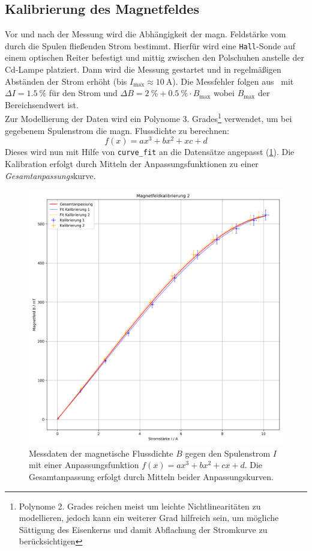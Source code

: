 \subsection{Kalibrierung des Magnetfeldes}
Vor und nach der Messung wird die Abhängigkeit der magn. Feldstärke vom durch die Spulen fließenden Strom bestimmt. Hierfür wird eine \texttt{Hall}-Sonde auf einem optischen Reiter befestigt und mittig zwischen den Polschuhen anstelle der Cd-Lampe platziert. Dann wird die Messung gestartet und in regelmäßigen Abständen der Strom erhöht (bis $I_{\text{max}}\approx \SI{10}{\ampere}$). Die Messfehler folgen aus~\cite{LD} mit $\Delta I = \SI{1.5}{\percent}$ für den Strom und $\Delta B = \SI{2}{\percent} + \SI{0.5}{\percent}\cdot B_{\text{max}}$ wobei $B_{\text{max}}$ der Bereichsendwert ist.\\
Zur Modellierung der Daten wird ein Polynome 3. Grades\footnote{Polynome 2. Grades reichen meist um leichte Nichtlinearitäten zu modellieren, jedoch kann ein weiterer Grad hilfreich sein, um mögliche Sättigung des Eisenkerns und damit Abflachung der Stromkurve zu berücksichtigen} verwendet, um bei gegebenem Spulenstrom die magn. Flussdichte zu berechnen:
\begin{equation*}
    f(x) = ax^3 + bx^2+xc+d
\end{equation*}
Dieses wird nun mit Hilfe von \texttt{curve\_fit} an die Datensätze angepasst (\cref{fig:magnetfeldkali_ges}). Die Kalibration erfolgt durch Mitteln der Anpassungsfunktionen zu einer \textit{Gesamtanpassungs}kurve.
\begin{figure}[h]
    \centering
    \includegraphics[width=0.8\linewidth]{plots/zeeman_pltKalibrierung_gesamt.png}
    \caption{Messdaten der magnetische Flussdichte $B$ gegen den Spulenstrom $I$ mit einer Anpassungsfunktion $ f(x)=ax^3+bx^2+cx+d $. Die Gesamtanpassung erfolgt durch Mitteln beider Anpassungskurven.}\label{fig:magnetfeldkali_ges}
\end{figure}
